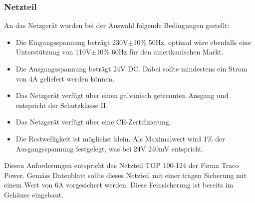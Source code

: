 \subsubsection{Netzteil}\label{Netzgeraet}
An das Netzgerät wurden bei der Auswahl folgende Bedingungen gestellt:
\begin{itemize}
	\item Die Eingangsspannung beträgt 230V$\pm$10$\%$ 50Hz, optimal wäre ebenfalls eine Unterstützung von 110V$\pm$10$\%$ 60Hz für den amerikanischen Markt.
	\item Die Ausgangsspannung beträgt 24V DC. Dabei sollte mindestens ein Strom von 4A geliefert werden können.
	\item Das Netzgerät verfügt über einen galvanisch getrennten Ausgang und entspricht der Schutzklasse II.
	\item Das Netzgerät verfügt über eine CE-Zertifizierung.
	\item Die Restwelligkeit ist möglichst klein. Als Maximalwert wird 1\% der Ausgangsspannung festgelegt, was bei 24V 240mV entspricht.
\end{itemize}
Diesen Anforderungen entspricht das Netzteil TOP 100-124 der Firma Traco Power. Gemäss Datenblatt \cite{db_tracopower} sollte dieses Netzteil mit einer trägen Sicherung mit einem Wert von 6A vorgesichert werden. Diese Feinsicherung ist bereits im Gehäuse eingebaut.